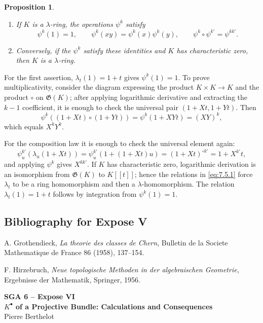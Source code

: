 \documentclass[13pt]{extarticle}
\newcommand{\Go}{\mathfrak G}
\newtheorem*{proposition}{Proposition}
\begin{document}
\begin{proposition}\label{prop:7.5}
\begin{enumerate}[label=(\roman*)]
\item If $K$ is a $\lambda$-ring, the operations $\psi^k$ satisfy
\begin{equation}\label{eq:7.5.1}
\psi^k(1)=1,
\qquad
\psi^k(xy)=\psi^k(x)\psi^k(y),
\qquad
\psi^k\circ\psi^{k'}=\psi^{kk'}.
\end{equation}
\item Conversely, if the $\psi^k$ satisfy these identities and $K$ has characteristic zero, then $K$ is a $\lambda$-ring.
\end{enumerate}
\end{proposition}

For the first assertion, $\lambda_t(1)=1+t$ gives $\psi^k(1)=1$. To prove multiplicativity, consider the diagram expressing the product $K\times K\to K$ and the product $\circ$ on $\Go(K)$; after applying logarithmic derivative and extracting the $k-1$ coefficient, it is enough to check the universal pair $(1+Xt,1+Yt)$. Then
\[
\psi^k((1+Xt)\circ(1+Yt))=\psi^k(1+XYt)=(XY)^k,
\]
which equals $X^kY^k$.

For the composition law it is enough to check the universal element again:
\[
\psi^{k'}_u(\lambda_u(1+Xt))=\psi^{k'}_u(1+(1+Xt)u)=(1+Xt)^{\circ k'}=1+X^{k'}t,
\]
and applying $\psi^k$ gives $X^{kk'}$. If $K$ has characteristic zero, logarithmic derivation is an isomorphism from $\Go(K)$ to $K[[t]]$; hence the relations in \eqref{eq:7.5.1} force $\lambda_t$ to be a ring homomorphism and then a $\lambda$-homomorphism. The relation $\lambda_t(1)=1+t$ follows by integration from $\psi^k(1)=1$.

\subsection*{Bibliography for Expose V}
\begin{enumerate}[label={[\arabic*]}]
\item A. Grothendieck, \emph{La theorie des classes de Chern}, Bulletin de la Societe Mathematique de France 86 (1958), 137--154.
\item F. Hirzebruch, \emph{Neue topologische Methoden in der algebraischen Geometrie}, Ergebnisse der Mathematik, Springer, 1956.
\end{enumerate}

\clearpage

\begin{center}
{\Large\textbf{SGA 6 -- Expose VI}}\\[0.35em]
{\large\textbf{$K^{\bullet}$ of a Projective Bundle: Calculations and Consequences}}\\[0.25em]
{\large Pierre Berthelot}
\end{center}
\end{document}
